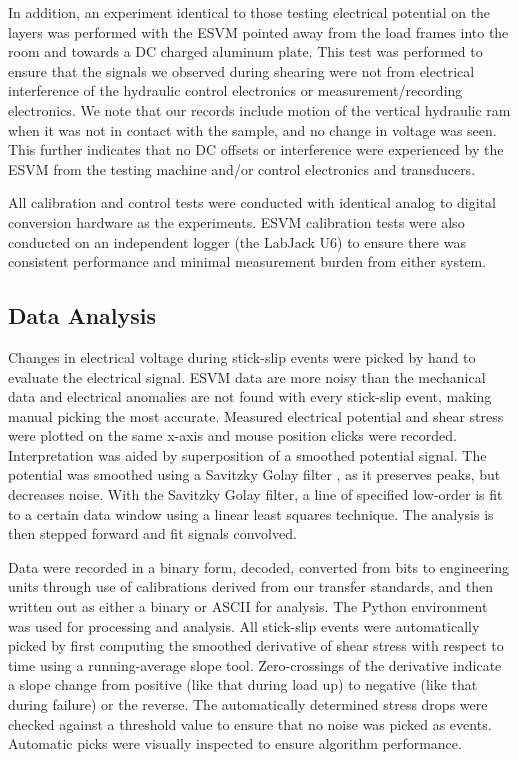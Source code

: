 In addition, an experiment identical to those testing electrical potential on the layers was performed with the ESVM pointed away from the load frames into the room and towards a DC charged aluminum plate.  This test was performed to ensure that the signals we observed during shearing were not from electrical interference of the hydraulic control electronics or measurement/recording electronics.  We note that our records include motion of the vertical hydraulic ram when it was not in contact with the sample, and no change in voltage was seen.  This further indicates that no DC offsets or interference were experienced by the ESVM from the testing machine and/or control electronics and transducers.


All calibration and control tests were conducted with identical analog to digital conversion hardware as the experiments.  ESVM calibration tests were also conducted on an independent logger (the LabJack U6) to ensure there was consistent performance and minimal measurement burden from either system.


\subsection{Data Analysis}

Changes in electrical voltage during stick-slip events were picked by hand to evaluate the electrical signal.  ESVM data are more noisy than the mechanical data and electrical anomalies are not found with every stick-slip event, making manual picking the most accurate.  Measured electrical potential and shear stress were plotted on the same x-axis and mouse position clicks were recorded.  Interpretation was aided by superposition of a smoothed potential signal.  The potential was smoothed using a Savitzky Golay filter \citep{SG1964}, as it preserves peaks, but decreases noise.  With the Savitzky Golay filter, a line of specified low-order is fit to a certain data window using a linear least squares technique.  The analysis is then stepped forward and fit signals convolved.

 Data were recorded in a binary form, decoded, converted from bits to engineering units through use of calibrations derived from our transfer standards, and then written out as either a binary or ASCII for analysis. The Python environment was used for processing and analysis.  All stick-slip events were automatically picked by first computing the smoothed derivative of shear stress with respect to time using a running-average slope tool.  Zero-crossings of the derivative indicate a slope change from positive (like that during load up) to negative (like that during failure) or the reverse.  The automatically determined stress drops were checked against a threshold value to ensure that no noise was picked as events.  Automatic picks were visually inspected to ensure algorithm performance.  

